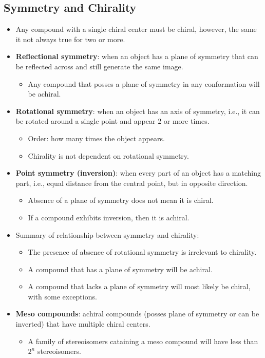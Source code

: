 \documentclass[12pt,a4paper]{article}
\begin{document}
\subsection{Symmetry and Chirality}
\begin{itemize}
    \item Any compound with a single chiral center must be chiral, however, the same it not always true for two or more.
    \item \textbf{Reflectional symmetry}: when an object has a {\color{o-Sun}plane of symmetry} that can be reflected across and still generate the same image.
        \begin{itemize}
            \item Any compound that posses a {\color{o-Sun}plane of symmetry} in any conformation will be {\color{o-Sun}achiral}.
        \end{itemize}
    \item \textbf{Rotational symmetry}: when an object has an {\color{o-Sun}axis of symmetry}, i.e., it can be rotated around a single point and appear 2 or more times.
        \begin{itemize}
            \item Order: how many times the object appears.
            \item Chirality is {\color{o-Sun}not dependent} on rotational symmetry.
        \end{itemize}
    \item \textbf{Point symmetry (inversion)}: when every part of an object has a matching part, i.e., {\color{o-Sun}equal distance} from the {\color{o-Sun}central point}, but in {\color{o-Sun}opposite direction}.
        \begin{itemize}
            \item Absence of a plane of symmetry does not mean it is chiral.
            \item If a compound exhibits {\color{o-Sun}inversion}, then it is {\color{o-Sun}achiral}.
        \end{itemize}
    \item Summary of relationship between symmetry and chirality:
        \begin{itemize}
            \item The presence of absence of rotational symmetry is irrelevant to chirality.
            \item A compound that has a plane of symmetry will be achiral.
            \item A compound that lacks a plane of symmetry will most likely be chiral, with some exceptions.
        \end{itemize}
    \item \textbf{Meso compounds}: achiral compounds (posses plane of symmetry or can be inverted) that have multiple chiral centers.
        \begin{itemize}
            \item A family of stereoisomers cataining a meso compound will have less than \(2^n\) stereoisomers.
        \end{itemize}

\end{itemize}
\end{document}
